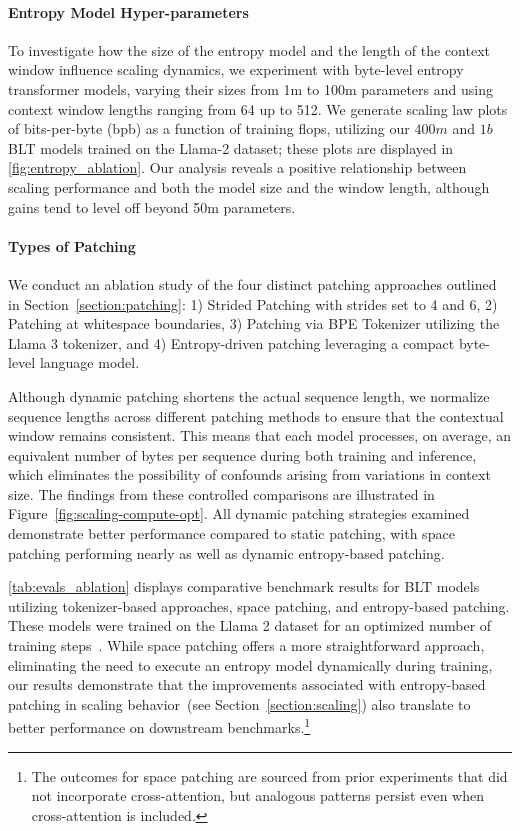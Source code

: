\paragraph{Entropy Model Hyper-parameters} To investigate how the size of the entropy model and the length of the context window influence scaling dynamics, we experiment with byte-level entropy transformer models, varying their sizes from 1m to 100m parameters and using context window lengths ranging from 64 up to 512. We generate scaling law plots of bits-per-byte (bpb) as a function of training flops, utilizing our $400m$ and $1b$ {\textsc BLT} models trained on the Llama-2 dataset; these plots are displayed in \autoref{fig:entropy_ablation}. Our analysis reveals a positive relationship between scaling performance and both the model size and the window length, although gains tend to level off beyond 50m parameters.

\paragraph{Types of Patching}

We conduct an ablation study of the four distinct patching approaches outlined in Section~\ref{section:patching}: 1) Strided Patching with strides set to 4 and 6, 2) Patching at whitespace boundaries, 3) Patching via BPE Tokenizer utilizing the Llama 3 tokenizer, and 4) Entropy-driven patching leveraging a compact byte-level language model.

Although dynamic patching shortens the actual sequence length, we normalize sequence lengths across different patching methods to ensure that the contextual window remains consistent. This means that each model processes, on average, an equivalent number of bytes per sequence during both training and inference, which eliminates the possibility of confounds arising from variations in context size. The findings from these controlled comparisons are illustrated in Figure~\ref{fig:scaling-compute-opt}. All dynamic patching strategies examined demonstrate better performance compared to static patching, with space patching performing nearly as well as dynamic entropy-based patching.

\autoref{tab:evals_ablation} displays comparative benchmark results for {\textsc BLT} models utilizing tokenizer-based approaches, space patching, and entropy-based patching. These models were trained on the Llama 2 dataset for an optimized number of training steps~\citep{dubey2024llama}. While space patching offers a more straightforward approach, eliminating the need to execute an entropy model dynamically during training, our results demonstrate that the improvements associated with entropy-based patching in scaling behavior~(see Section~\ref{section:scaling}) also translate to better performance on downstream benchmarks.\footnote{The outcomes for space patching are sourced from prior experiments that did not incorporate cross-attention, but analogous patterns persist even when cross-attention is included.}

